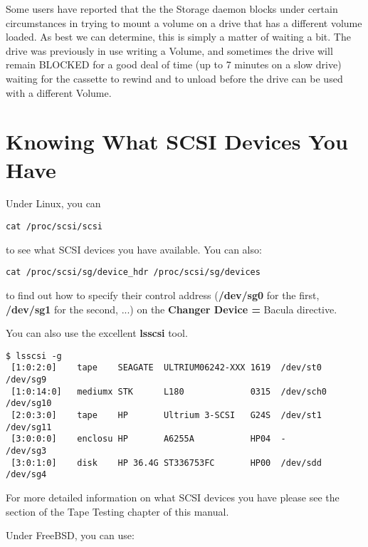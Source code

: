 Some users have reported that the the Storage daemon blocks under certain
circumstances in trying to mount a volume on a drive that has a different
volume loaded.  As best we can determine, this is simply a matter of
waiting a bit.  The drive was previously in use writing a Volume, and
sometimes the drive will remain BLOCKED for a good deal of time (up to 7
minutes on a slow drive) waiting for the cassette to rewind and to unload
before the drive can be used with a different Volume.

\label{SCSI devices}
\section{Knowing What SCSI Devices You Have}

Under Linux, you can 

\footnotesize
\begin{verbatim}
cat /proc/scsi/scsi
\end{verbatim}
\normalsize

to see what SCSI devices you have available. You can also: 

\footnotesize
\begin{verbatim}
cat /proc/scsi/sg/device_hdr /proc/scsi/sg/devices
\end{verbatim}
\normalsize

to find out how to specify their control address ({\bf /dev/sg0} for the
first, {\bf /dev/sg1} for the second, ...) on the {\bf Changer Device = }
Bacula directive. 

You can also use the excellent  {\bf lsscsi} tool.
\footnotesize
\begin{verbatim}
$ lsscsi -g
 [1:0:2:0]    tape    SEAGATE  ULTRIUM06242-XXX 1619  /dev/st0  /dev/sg9
 [1:0:14:0]   mediumx STK      L180             0315  /dev/sch0 /dev/sg10
 [2:0:3:0]    tape    HP       Ultrium 3-SCSI   G24S  /dev/st1  /dev/sg11
 [3:0:0:0]    enclosu HP       A6255A           HP04  -         /dev/sg3
 [3:0:1:0]    disk    HP 36.4G ST336753FC       HP00  /dev/sdd  /dev/sg4
\end{verbatim}
\normalsize

For more detailed information on what SCSI devices you have please see
the   section of the Tape Testing
chapter of this manual.

Under FreeBSD, you can use: 

